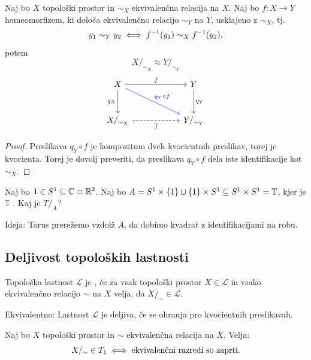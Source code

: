 \begin{trditev}
    Naj bo \(X\) topološki prostor in \(\sim_X\) ekvivalenčna relacija na \(X\). Naj bo \(f: X \to Y\) homeomorfizem, ki določa ekvivalenčno relacijo \(\sim_Y\) na \(Y\), usklajeno z \(\sim_X\), tj. 
    \[y_1 \sim_Y y_2 \iff f^{-1}(y_1) \sim_X f^{-1}(y_2),\]
    potem \[X/_{\sim_X} \approx Y/_{\sim_Y}\]
    \[
        \begin{tikzcd}[column sep=2cm, row sep=1cm]
            X \arrow{r}{f} \arrow[swap]{d}{q_X} \arrow[draw=blue]{rd}{\textcolor{blue}{q_Y \circ f}} & Y \arrow{d}{q_Y} \\
            X/_{\sim_X} \arrow[dashed, swap]{r}{\overline{f}} & Y/_{\sim_Y}
        \end{tikzcd}
    \]
\end{trditev}
\begin{proof}
    Preslikava \(q_Y \circ f\) je kompozitum dveh kvocientnih preslikav, torej je kvocienta. Torej je dovolj preveriti, da preslikava \(q_Y \circ f\) dela iste identifikacije kot \(\sim_X\).
\end{proof}

\begin{primer}
    Naj bo \(1 \in S^1 \subseteq \mathbb{C} \equiv \mathbb{R}^2\). Naj bo \(A = S^1 \times \left\{1\right\} \cup \left\{1\right\} \times S^1 \subseteq S^1 \times S^1 = \mathbb{T}\), kjer je \(\mathbb{T}\) . Kaj je \(T/_A\)?

    Ideja: Torus prerežemo vzdolž \(A\), da dobimo kvadrat z identifikacijami na robu.
\end{primer}

\subsection{Deljivost topoloških lastnosti}
\begin{definicija}
    Topološka lastnost \(\mathcal{L}\) je , če za vsak topološki prostor \(X \in \mathcal{L}\) in vsako ekvivalenčno relacijo \(\sim\) na \(X\) velja, da \(X/_\sim \in \mathcal{L}\).

    Ekvivalentno: Lastnost \(\mathcal{L}\) je deljiva, če se ohranja pro kvocientnih preslikavah.
\end{definicija}

\begin{trditev}
    Naj bo \(X\) topološki prostor in \(\sim\) ekvivalenčna relacija na \(X\). Velja:
    \[X/_\sim \in T_1 \iff \text{ekvivalenčni razredi so zaprti}.\]
\end{trditev}

